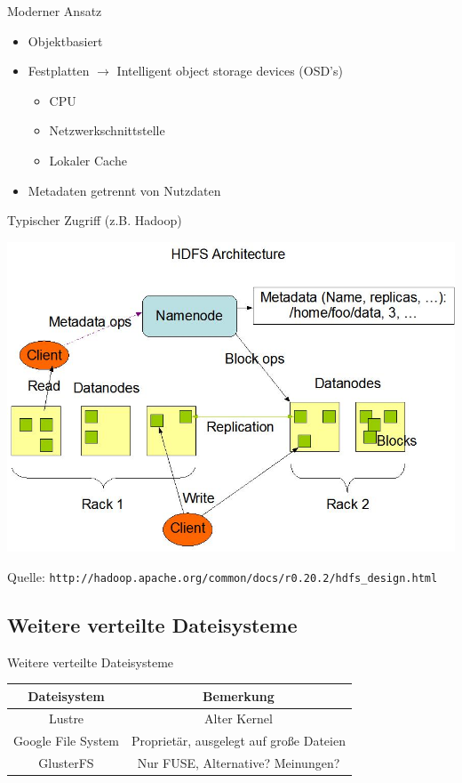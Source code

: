 \documentclass[hyperref={xetex}]{beamer}
\begin{document}
\begin{frame}{Moderner Ansatz}
	\begin{itemize}
		\item Objektbasiert
		\item Festplatten $\rightarrow$ Intelligent object storage devices (OSD's)
		\begin{itemize}
			\item CPU
			\item Netzwerkschnittstelle
			\item Lokaler Cache
		\end{itemize}
		\item Metadaten getrennt von Nutzdaten
	\end{itemize}
\end{frame}


\begin{frame}{Typischer Zugriff (z.B. Hadoop)}
	\begin{center}
	\includegraphics[scale=0.2]{images/hdfsarchitecture.jpg}
	\end{center}
	\small
	Quelle: \texttt{http://hadoop.apache.org/common/docs/r0.20.2/hdfs\_design.html}
\end{frame}

\subsection{Weitere verteilte Dateisysteme}
\begin{frame}{Weitere verteilte Dateisysteme}
	\begin{center}
		\begin{tabular}{|c|c|}
		\hline
		Dateisystem & Bemerkung \\
		\hline
		Lustre & Alter Kernel \\
		Google File System & Propriet\"ar, ausgelegt auf große Dateien \\
		GlusterFS & Nur FUSE, Alternative? Meinungen?\\
		\hline
	\end{tabular}
	\end{center}
\end{frame}
\end{document}
